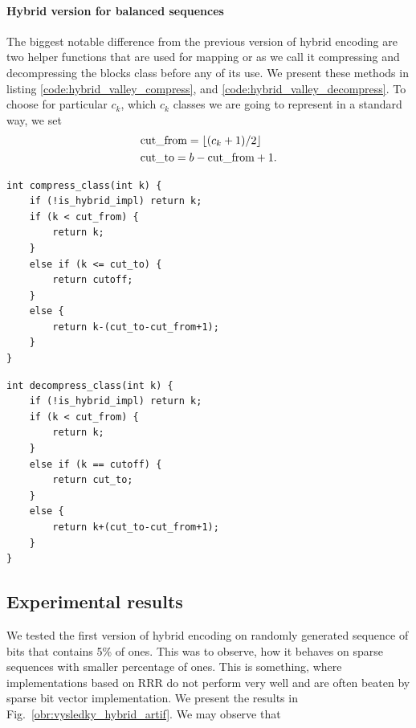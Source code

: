 \paragraph{Hybrid version for balanced sequences}

The biggest notable difference from the previous version of hybrid encoding are two
helper functions that are used for mapping or as we call it compressing and decompressing
the blocks class before any of its use. We present these methods in listing \ref{code:hybrid_valley_compress},
and \ref{code:hybrid_valley_decompress}. To choose for particular $c_k$, which $c_k$ classes we are
going to represent in a standard way, we set
\begin{align*} %
&\text{cut\_from} = \floor{(c_k+1)/2} \\
&\text{cut\_to} = b-\text{cut\_from}+1.
\end{align*}

\begin{lstlisting}
int compress_class(int k) {
	if (!is_hybrid_impl) return k;
	if (k < cut_from) {
		return k;
	}
	else if (k <= cut_to) {
		return cutoff;
	}
	else {
		return k-(cut_to-cut_from+1);
	}
}
\end{lstlisting}

\begin{lstlisting}
int decompress_class(int k) {
	if (!is_hybrid_impl) return k;
	if (k < cut_from) {
		return k;
	}
	else if (k == cutoff) {
		return cut_to;
	}
	else {
		return k+(cut_to-cut_from+1);
	}
}
\end{lstlisting}

\subsection{Experimental results}

We tested the first version of hybrid encoding on randomly generated sequence of bits that contains 5\% of ones.
This was to observe, how it behaves on sparse sequences with smaller percentage of ones. This is something, where
implementations based on RRR do not perform very well and are often beaten by sparse bit vector implementation.
We present the results in Fig.~\ref{obr:vysledky_hybrid_artif}. We may observe that


